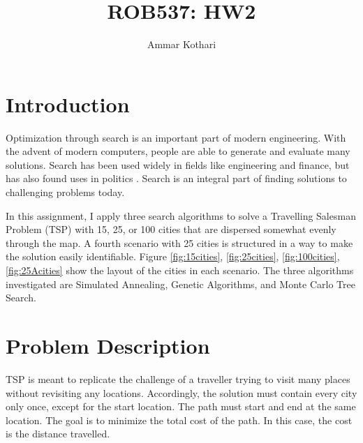 \documentclass[a4paper]{article}
\title{ROB537: HW2}
\author{Ammar Kothari}
\date{}
\begin{document}
\maketitle

\section{Introduction}
Optimization through search is an important part of modern engineering.  With the advent of modern computers, people are able to generate and evaluate many solutions.  Search has been used widely in fields like engineering and finance, but has also found uses in politics \cite{totenberg_2017}.  Search is an integral part of finding solutions to challenging problems today.

In this assignment, I apply three search algorithms to solve a Travelling Salesman Problem (TSP) with 15, 25, or 100 cities that are dispersed somewhat evenly through the map.  A fourth scenario with 25 cities is structured in a way to make the solution easily identifiable.  Figure \ref{fig:15cities}, \ref{fig:25cities}, \ref{fig:100cities}, \ref{fig:25Acities} show the layout of the cities in each scenario.  The three algorithms investigated are Simulated Annealing, Genetic Algorithms, and Monte Carlo Tree Search.

\section{Problem Description}
TSP is meant to replicate the challenge of a traveller trying to visit many places without revisiting any locations.  Accordingly, the solution must contain every city only once, except for the start location.  The path must start and end at the same location.  The goal is to minimize the total cost of the path.  In this case, the cost is the distance travelled.


















\end{document}

